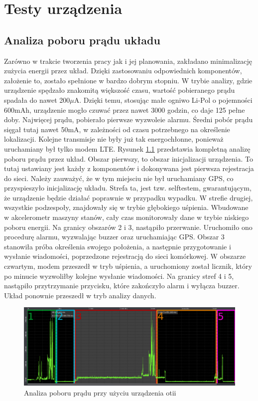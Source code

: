\chapter{Testy urządzenia}
\section{Analiza poboru prądu układu}
Zarówno w trakcie tworzenia pracy jak i jej planowania, zakładano minimalizację zużycia energii przez układ. Dzięki zastosowaniu odpowiednich komponentów, założenie to, zostało spełnione w bardzo dobrym stopniu. W trybie analizy, gdzie urządzenie spędzało znakomitą większość czasu, wartość pobieranego prądu spadała do nawet 200$\mu$A. Dzięki temu, stosując małe ogniwo Li-Pol o pojemności 600mAh, urządzenie mogło czuwać przez nawet 3000 godzin, co daje 125 pełne doby. Najwięcej prądu, pobierało pierwsze wyzwoleie alarmu. Średni pobór prądu sięgał tutaj nawet 50mA, w zależności od czasu potrzebnego na określenie lokalizacji. Kolejne transmisje nie były już tak energochłonne, ponieważ uruchamiany był tylko modem LTE.
\newline
Rysunek \ref{img:current_summary} przedstawia kompletną analizę poboru prądu przez układ. Obszar pierwszy, to obszar inicjalizacji urządzenia. To tutaj ustawiany jest każdy z komponentów i dokonywana jest pierwsza rejestracja do sieci. Należy zauważyć, że w tym miejsciu nie był uruchamiany GPS, co przyspieszyło inicjalizację układu. Strefa ta, jest tzw. selftestem, gwarantującym, że urządzenie będzie działać poprawnie w przypadku wypadku. W strefie drugiej, wszystkie podzespoły, znajdowały się w trybie głębokiego uśpienia. Wbudowane w akcelerometr maszyny stanów, cały czas monitorowały dane w trybie niskiego poboru energii. Na granicy obszarów 2 i 3, nastąpiło przerwanie. Uruchomiło ono procedurę alarmu, wyzwalając buzzer oraz uruchamiając GPS. Obszar 3 stanowiła próba określenia swojego położenia, a następnie przygotowanie i wysłanie wiadomości, poprzedzone rejestracją do sieci komórkowej. W obszarze czwartym, modem przeszedł w tryb uśpienia, a uruchomiony został licznik, który po minucie wyzwoliłby kolejne wysłanie wiadomości. Na granicy stref 4 i 5, nastąpiło przytrzymanie przycisku, które zakończyło alarm i wyłącza buzzer. Układ ponownie przeszedł w tryb analizy danych.
	

\begin{figure}[h]
    \centering
    \includegraphics[width=14cm]{Graphics/connection_with_fix_divided.png}
    \caption{Analiza poboru prądu przy użyciu urządzenia otii}
    \label{img:current_summary}
\end{figure}


